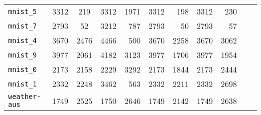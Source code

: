 \begin{tabular}{lccrrrrrrrr}
\texttt{mnist\_5} & 3312 & 219 & 3312 & 1971 & 3312 & 198 & 3312 & 230\\
\texttt{mnist\_7} & 2793 & 52 & 3212 & 787 & 2793 & 50 & 2793 & 57\\
\texttt{mnist\_4} & 3670 & 2476 & 4466 & 500 & 3670 & 2258 & 3670 & 3062\\
\texttt{mnist\_9} & 3977 & 2061 & 4182 & 3123 & 3977 & 1706 & 3977 & 1954\\
\texttt{mnist\_0} & 2173 & 2158 & 2229 & 3292 & 2173 & 1844 & 2173 & 2444\\
\texttt{mnist\_1} & 2332 & 2248 & 3462 & 563 & 2332 & 2211 & 2332 & 2698\\
\texttt{weather-aus} & 1749 & 2525 & 1750 & 2646 & 1749 & 2142 & 1749 & 2638\\
\bottomrule
\end{tabular}
